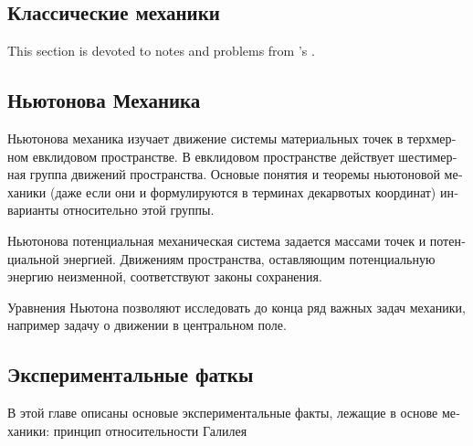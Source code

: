 \begin{otherlanguage}{russian}
\chapter{Классические механики}
This section is devoted to notes and problems from 's \emph{}
\cite{arnold}.

\section{Ньютонова Механика}
Ньютонова механика изучает движение системы материальных точек в терхмерном
евклидовом пространстве. В евклидовом пространстве действует шестимерная
группа движений пространства. Основые понятия и теоремы ньютоновой механики
(даже если они и формулируются в терминах декарвотых координат) инварианты
относительно этой группы.

Ньютонова потенциальная механическая система задается массами точек и
потенциальной энергией. Движениям пространства, оставляющим потенциальную
энергию неизменной, соответствуют законы сохранения.

Уравнения Ньютона позволяют исследовать до конца ряд важных задач механики,
например задачу о движении в центральном поле.

\section{Экспериментальные фаткы}
В этой главе  описаны основые экспериментальные факты, лежащие в основе
механики: принцип относительности Галилея
\end{otherlanguage}


